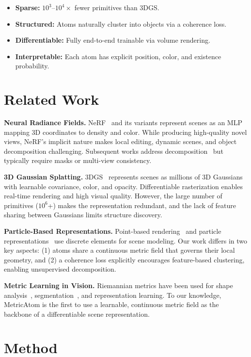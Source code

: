 \documentclass[11pt]{article}
\begin{document}
\begin{itemize}
    \item \textbf{Sparse:} $10^3$--$10^4\times$ fewer primitives than 3DGS.
    \item \textbf{Structured:} Atoms naturally cluster into objects via a coherence loss.
    \item \textbf{Differentiable:} Fully end-to-end trainable via volume rendering.
    \item \textbf{Interpretable:} Each atom has explicit position, color, and existence probability.
\end{itemize}

\section{Related Work}

\textbf{Neural Radiance Fields.} NeRF~\cite{nerf} and its variants represent scenes as an MLP mapping 3D coordinates to density and color. While producing high-quality novel views, NeRF's implicit nature makes local editing, dynamic scenes, and object decomposition challenging. Subsequent works address decomposition~\cite{nerf_supervision, obj_nerf} but typically require masks or multi-view consistency.

\textbf{3D Gaussian Splatting.} 3DGS~\cite{3dgs} represents scenes as millions of 3D Gaussians with learnable covariance, color, and opacity. Differentiable rasterization enables real-time rendering and high visual quality. However, the large number of primitives ($10^6$+) makes the representation redundant, and the lack of feature sharing between Gaussians limits structure discovery.

\textbf{Particle-Based Representations.} Point-based rendering~\cite{pointnet, point_rend} and particle representations~\cite{particle_nerf} use discrete elements for scene modeling. Our work differs in two key aspects: (1) atoms share a continuous metric field that governs their local geometry, and (2) a coherence loss explicitly encourages feature-based clustering, enabling unsupervised decomposition.

\textbf{Metric Learning in Vision.} Riemannian metrics have been used for shape analysis~\cite{metric_shape}, segmentation~\cite{metric_seg}, and representation learning. To our knowledge, MetricAtom is the first to use a learnable, continuous metric field as the backbone of a differentiable scene representation.

\section{Method}
\end{document}
